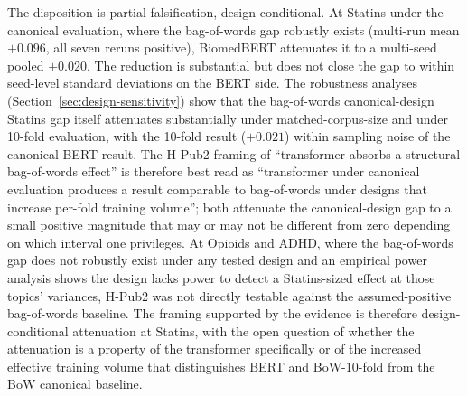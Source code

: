 \documentclass{article}
\begin{document}
The disposition is partial falsification, design-conditional. At Statins under the canonical evaluation, where the bag-of-words gap robustly exists (multi-run mean $+0.096$, all seven reruns positive), BiomedBERT attenuates it to a multi-seed pooled $+0.020$. The reduction is substantial but does not close the gap to within seed-level standard deviations on the BERT side. The robustness analyses (Section~\ref{sec:design-sensitivity}) show that the bag-of-words canonical-design Statins gap itself attenuates substantially under matched-corpus-size and under 10-fold evaluation, with the 10-fold result ($+0.021$) within sampling noise of the canonical BERT result. The H-Pub2 framing of ``transformer absorbs a structural bag-of-words effect'' is therefore best read as ``transformer under canonical evaluation produces a result comparable to bag-of-words under designs that increase per-fold training volume''; both attenuate the canonical-design gap to a small positive magnitude that may or may not be different from zero depending on which interval one privileges. At Opioids and ADHD, where the bag-of-words gap does not robustly exist under any tested design and an empirical power analysis shows the design lacks power to detect a Statins-sized effect at those topics' variances, H-Pub2 was not directly testable against the assumed-positive bag-of-words baseline. The framing supported by the evidence is therefore design-conditional attenuation at Statins, with the open question of whether the attenuation is a property of the transformer specifically or of the increased effective training volume that distinguishes BERT and BoW-10-fold from the BoW canonical baseline.
\end{document}
